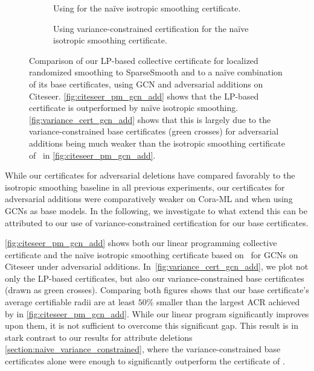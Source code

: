 \begin{figure}[ht]
    \vskip 0.2in
    \centering
    \begin{subfigure}[b]{0.49\textwidth}
        \resizebox{\textwidth}{!}{}
        \caption{Using \citep{Bojchevski2020} for the na\"ive isotropic smoothing certificate.}
        \label{fig:citeseer_pm_gcn_add}
    \end{subfigure}
    \hfill
    \begin{subfigure}[b]{0.49\textwidth}
        \resizebox{\textwidth}{!}{}
        \caption{Using variance-constrained certification  for the na\"ive isotropic smoothing certificate.}
        \label{fig:variance_cert_gcn_add}
    \end{subfigure}
    \caption{Comparison of our LP-based collective certificate for localized randomized smoothing to SparseSmooth and to a na\"ive combination of its base certificates, using GCN and adversarial additions on Citeseer.
    \autoref{fig:citeseer_pm_gcn_add} shows that the LP-based certificate is outperformed by na\"ive isotropic smoothing.
    \autoref{fig:variance_cert_gcn_add} shows that this is largely due to the variance-constrained base certificates (green crosses) for adversarial additions being much weaker than the isotropic smoothing certificate of~\citep{Bojchevski2020} in \autoref{fig:citeseer_pm_gcn_add}.
    }
    \label{fig:experiments_bojchevski_vs_variance_lower_robustness}
    \vskip -0.2in
\end{figure}


While our certificates for adversarial deletions have compared favorably to the isotropic smoothing baseline in all previous experiments,
our certificates for adversarial additions were comparatively weaker on Cora-ML and when using GCNs as base models.
In the following, we investigate to what extend this can be attributed to our use of variance-constrained certification for our base certificates.

\autoref{fig:citeseer_pm_gcn_add} shows both our linear programming collective certificate and the na\"ive isotropic smoothing certificate based on~\citep{Bojchevski2020} for GCNs on Citeseer under adversarial additions.
In~\autoref{fig:variance_cert_gcn_add}, we plot not only the LP-based certificates, but also our variance-constrained base certificates (drawn as green crosses).
Comparing both figures shows that our base certificate's average certifiable radii are at least $50\%$ smaller than the largest ACR achieved by \citep{Bojchevski2020} in \autoref{fig:citeseer_pm_gcn_add}.
While our linear program significantly improves upon them, it is not sufficient to overcome this significant gap.
This result is in stark contrast to our results for attribute deletions \autoref{section:naive_variance_constrained}, where the variance-constrained base certificates alone were enough to significantly outperform the certificate of \citep{Bojchevski2020}.


